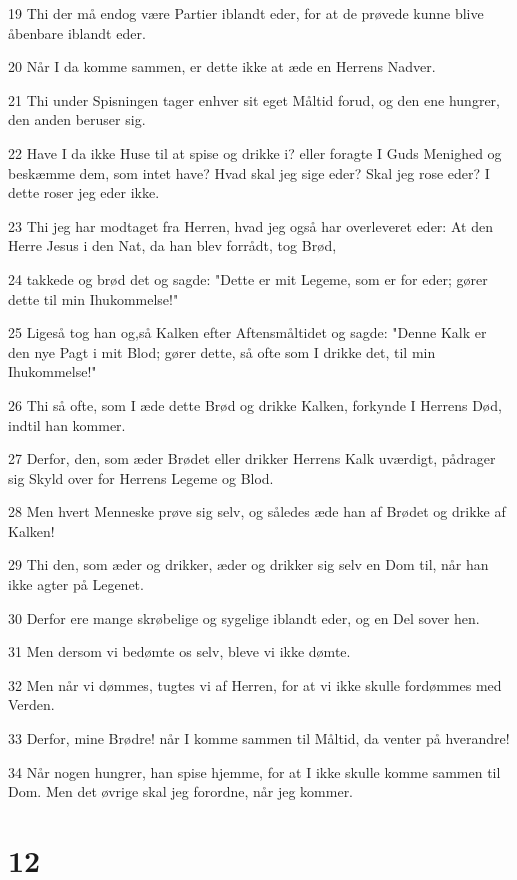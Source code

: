 \par 19 Thi der må endog være Partier iblandt eder, for at de prøvede kunne blive åbenbare iblandt eder.
\par 20 Når I da komme sammen, er dette ikke at æde en Herrens Nadver.
\par 21 Thi under Spisningen tager enhver sit eget Måltid forud, og den ene hungrer, den anden beruser sig.
\par 22 Have I da ikke Huse til at spise og drikke i? eller foragte I Guds Menighed og beskæmme dem, som intet have? Hvad skal jeg sige eder? Skal jeg rose eder? I dette roser jeg eder ikke.
\par 23 Thi jeg har modtaget fra Herren, hvad jeg også har overleveret eder: At den Herre Jesus i den Nat, da han blev forrådt, tog Brød,
\par 24 takkede og brød det og sagde: "Dette er mit Legeme, som er for eder; gører dette til min Ihukommelse!"
\par 25 Ligeså tog han og,så Kalken efter Aftensmåltidet og sagde: "Denne Kalk er den nye Pagt i mit Blod; gører dette, så ofte som I drikke det, til min Ihukommelse!"
\par 26 Thi så ofte, som I æde dette Brød og drikke Kalken, forkynde I Herrens Død, indtil han kommer.
\par 27 Derfor, den, som æder Brødet eller drikker Herrens Kalk uværdigt, pådrager sig Skyld over for Herrens Legeme og Blod.
\par 28 Men hvert Menneske prøve sig selv, og således æde han af Brødet og drikke af Kalken!
\par 29 Thi den, som æder og drikker, æder og drikker sig selv en Dom til, når han ikke agter på Legenet.
\par 30 Derfor ere mange skrøbelige og sygelige iblandt eder, og en Del sover hen.
\par 31 Men dersom vi bedømte os selv, bleve vi ikke dømte.
\par 32 Men når vi dømmes, tugtes vi af Herren, for at vi ikke skulle fordømmes med Verden.
\par 33 Derfor, mine Brødre! når I komme sammen til Måltid, da venter på hverandre!
\par 34 Når nogen hungrer, han spise hjemme, for at I ikke skulle komme sammen til Dom. Men det øvrige skal jeg forordne, når jeg kommer.

\chapter{12}

